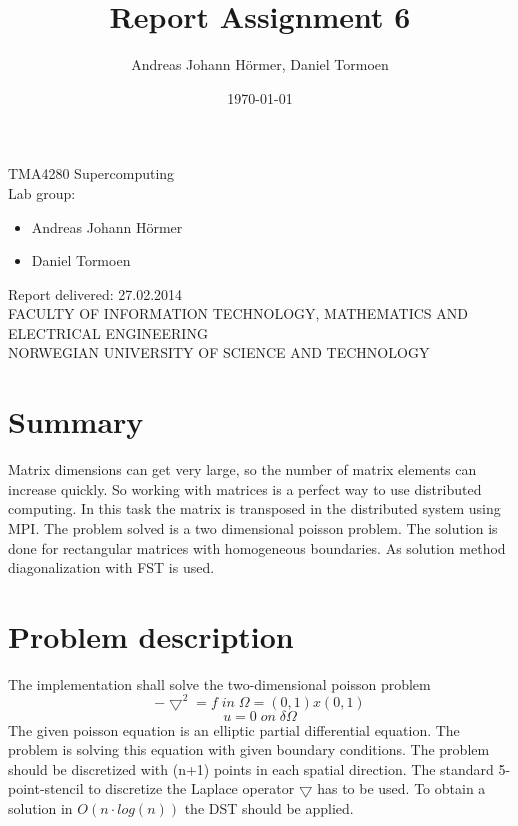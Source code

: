 \documentclass{article}
\title{Report Assignment 6}
\author{Andreas Johann H\"ormer, Daniel Tormoen}
\date{\today}
\begin{document}
\thispagestyle{empty}
\maketitle
\thispagestyle{empty}
\begin{center}
TMA4280 Supercomputing\\[3cm]
Lab group:
\begin{itemize}
\item Andreas Johann H\"ormer
\item Daniel Tormoen\\[3cm]
\end{itemize}
Report delivered: 27.02.2014\\[6cm]
FACULTY OF INFORMATION TECHNOLOGY, MATHEMATICS AND ELECTRICAL ENGINEERING\\
NORWEGIAN UNIVERSITY OF SCIENCE AND TECHNOLOGY
\end{center}
\thispagestyle{empty}
\newpage
\tableofcontents
\thispagestyle{empty}
\newpage
\section*{Summary}
\thispagestyle{empty}
Matrix dimensions can get very large, so the number of matrix elements can increase quickly. So working with matrices is a perfect way to use distributed computing. In this task the matrix is transposed in the distributed system using MPI. The problem solved is a two dimensional poisson problem. The solution is done for rectangular matrices with homogeneous boundaries. As solution method diagonalization with FST is used.
\newpage
\setcounter{page}{1}
\section{Problem description}
The implementation shall solve the two-dimensional poisson problem 
\begin{equation}
-\bigtriangledown^2=f\;in\;\Omega = (0,1)x(0,1)
\end{equation}
\begin{equation}
u = 0\;on\;\delta\Omega
\end{equation}
The given poisson equation is an elliptic partial differential equation. The problem is solving this equation with given boundary conditions. 
The problem should be discretized with (n+1) points in each spatial direction. The standard 5-point-stencil to discretize the Laplace operator $\bigtriangledown$ has to be used. To obtain a solution in $O(n\cdot log(n))$ the DST should be applied.
\end{document}
